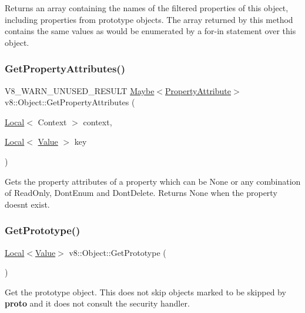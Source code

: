 Returns an array containing the names of the filtered properties of this object, including properties from prototype objects. The array returned by this method contains the same values as would be enumerated by a for-\/in statement over this object. \mbox{\label{classv8_1_1Object_ae5c97a596bcb634c50605a574358a9c6}} 
\subsubsection{\texorpdfstring{Get\+Property\+Attributes()}{GetPropertyAttributes()}}
{\footnotesize\ttfamily V8\+\_\+\+W\+A\+R\+N\+\_\+\+U\+N\+U\+S\+E\+D\+\_\+\+R\+E\+S\+U\+LT \mbox{\hyperlink{classv8_1_1Maybe}{Maybe}}$<$\mbox{\hyperlink{namespacev8_a05f25f935e108a1ea2d150e274602b87}{Property\+Attribute}}$>$ v8\+::\+Object\+::\+Get\+Property\+Attributes (\begin{DoxyParamCaption}\item[{\mbox{\hyperlink{classv8_1_1Local}{Local}}$<$ Context $>$}]{context,  }\item[{\mbox{\hyperlink{classv8_1_1Local}{Local}}$<$ \mbox{\hyperlink{classv8_1_1Value}{Value}} $>$}]{key }\end{DoxyParamCaption})}

Gets the property attributes of a property which can be None or any combination of Read\+Only, Dont\+Enum and Dont\+Delete. Returns None when the property doesn\textquotesingle{}t exist. \mbox{\label{classv8_1_1Object_ae8d3fed7d6dbd667c29cabb3039fe7af}} 
\subsubsection{\texorpdfstring{Get\+Prototype()}{GetPrototype()}}
{\footnotesize\ttfamily \mbox{\hyperlink{classv8_1_1Local}{Local}}$<$\mbox{\hyperlink{classv8_1_1Value}{Value}}$>$ v8\+::\+Object\+::\+Get\+Prototype (\begin{DoxyParamCaption}{ }\end{DoxyParamCaption})}

Get the prototype object. This does not skip objects marked to be skipped by {\bfseries proto} and it does not consult the security handler. \mbox{\label{classv8_1_1Object_aecec39cefb3e394e1696fe618862efec}} 
